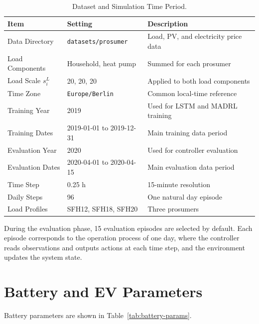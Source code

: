 \begin{table}[htpb]
  \centering
  \caption{Dataset and Simulation Time Period.}\label{tab:dataset-period}
  \begin{tabular}{lll}
    \toprule
    Item & Setting & Description \\
    \midrule
    Data Directory & \texttt{datasets/prosumer} & Load, PV, and electricity price data \\
    Load Components & Household, heat pump & Summed for each prosumer \\
    Load Scale \(s^L_i\) & 20, 20, 20 & Applied to both load components \\
    Time Zone & \texttt{Europe/Berlin} & Common local-time reference \\
    Training Year & 2019 & Used for LSTM and MADRL training \\
    Training Dates & 2019-01-01 to 2019-12-31 & Main training data period \\
    Evaluation Year & 2020 & Used for controller evaluation \\
    Evaluation Dates & 2020-04-01 to 2020-04-15 & Main evaluation data period \\
    Time Step & 0.25 h & 15-minute resolution \\
    Daily Steps & 96 & One natural day episode \\
    Load Profiles & SFH12, SFH18, SFH20 & Three prosumers \\
    \bottomrule
  \end{tabular}
\end{table}

During the evaluation phase, 15 evaluation episodes are selected by default. Each episode corresponds to the operation process of one day, where the controller reads observations and outputs actions at each time step, and the environment updates the system state.

\section{Battery and EV Parameters}

Battery parameters are shown in Table~\ref{tab:battery-params}.

